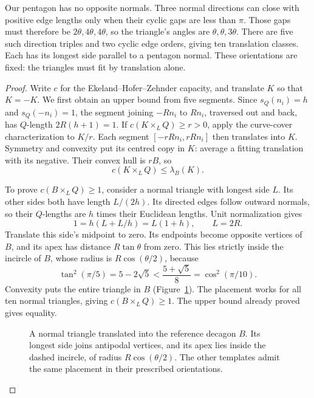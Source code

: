 Our pentagon has no opposite normals. Three normal directions can close
with positive edge lengths only when their cyclic gaps are less than $\pi$.
Those gaps must therefore be $2\theta,4\theta,4\theta$, so the triangle's
angles are $\theta,\theta,3\theta$. There are five such direction triples
and two cyclic edge orders, giving ten translation classes. Each has its
longest side parallel to a pentagon normal. These orientations are fixed:
the triangles must fit by translation alone.

\begin{proof}
Write $c$ for the Ekeland--Hofer--Zehnder capacity, and translate $K$ so
that $K=-K$. We first obtain an upper bound from five segments.
Since $s_Q(n_i)=h$ and $s_Q(-n_i)=1$, the segment joining $-Rn_i$ to
$Rn_i$, traversed out and back, has $Q$-length $2R(h+1)=1$.
If $c(K\times_L Q)\ge r>0$, apply the curve-cover characterization to
$K/r$. Each segment $[-rRn_i,rRn_i]$ then translates into $K$.
Symmetry and convexity put its centred copy in $K$: average a fitting
translation with its negative. Their convex hull is $rB$, so
\[
 c(K\times_L Q)\le\lambda_B(K).
\]

To prove $c(B\times_L Q)\ge1$, consider a normal triangle with longest
side $L$. Its other sides both have length $L/(2h)$. Its directed edges
follow outward normals, so their $Q$-lengths are $h$ times their Euclidean
lengths. Unit normalization gives
\[
 1=h(L+L/h)=L(1+h),\qquad L=2R.
\]
Translate this side's midpoint to zero. Its endpoints become opposite
vertices of $B$, and its apex has distance $R\tan\theta$ from zero.
This lies strictly inside the incircle of $B$, whose radius is
$R\cos(\theta/2)$, because
\[
 \tan^2(\pi/5)=5-2\sqrt5
       <\frac{5+\sqrt5}{8}=\cos^2(\pi/10).
\]
Convexity puts the entire triangle in $B$
(Figure~\ref{fig:pentagon-symmetric-calibration}).
The placement works for all ten normal triangles, giving
$c(B\times_L Q)\ge1$. The upper bound already proved gives equality.

\begin{figure}[htbp]
\centering
{}
\caption{A normal triangle translated into the reference decagon $B$.
Its longest side joins antipodal vertices, and its apex lies inside the
dashed incircle, of radius $R\cos(\theta/2)$. The other templates admit
the same placement in their prescribed orientations.}
\label{fig:pentagon-symmetric-calibration}
\end{figure}


\end{proof}
